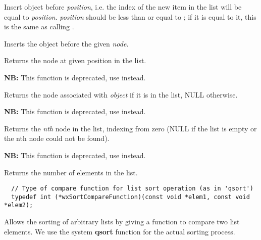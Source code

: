 {Insert object before {\it position}, i.e. the index of the new item in the
list will be equal to {\it position}. {\it position} should be less than or
equal to ; if it is equal to it, this is the
same as calling .


Inserts the object before the given {\it node}.

\label{wxlistitem}


Returns the node at given position in the list.

\label{wxlistmember}


{\bf NB:} This function is deprecated, use  instead.

Returns the node associated with {\it object} if it is in the list, NULL otherwise.

\label{wxlistnth}


{\bf NB:} This function is deprecated, use  instead.

Returns the {\it nth} node in the list, indexing from zero (NULL if the list is empty
or the nth node could not be found).

\label{wxlistnumber}


{\bf NB:} This function is deprecated, use  instead.

Returns the number of elements in the list.

\label{wxlistsort}


\begin{verbatim}
  // Type of compare function for list sort operation (as in 'qsort')
  typedef int (*wxSortCompareFunction)(const void *elem1, const void *elem2);
\end{verbatim}

Allows the sorting of arbitrary lists by giving
a function to compare two list elements. We use the system {\bf qsort} function
for the actual sorting process.

}
